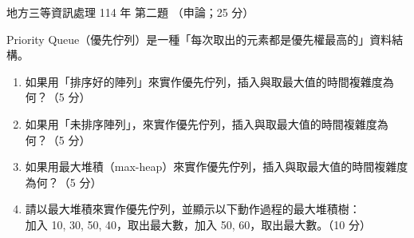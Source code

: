 \begin{pastexam}[label={px:df3-114-ds-02}]{地方三等資訊處理 114 年 第二題}
（申論；25 分）

Priority Queue（優先佇列）是一種「每次取出的元素都是優先權最高的」資料結構。
\begin{enumerate}[leftmargin=2.2em]
\item[㈠] 如果用「排序好的陣列」來實作優先佇列，插入與取最大值的時間複雜度為何？（5 分）
\item[㈡] 如果用「未排序陣列」，來實作優先佇列，插入與取最大值的時間複雜度為何？（5 分）
\item[㈢] 如果用最大堆積（max-heap）來實作優先佇列，插入與取最大值的時間複雜度為何？（5 分）
\item[㈣] 請以最大堆積來實作優先佇列，並顯示以下動作過程的最大堆積樹：\\
加入 10, 30, 50, 40，取出最大數，加入 50, 60，取出最大數。（10 分）
\end{enumerate}
\end{pastexam}

